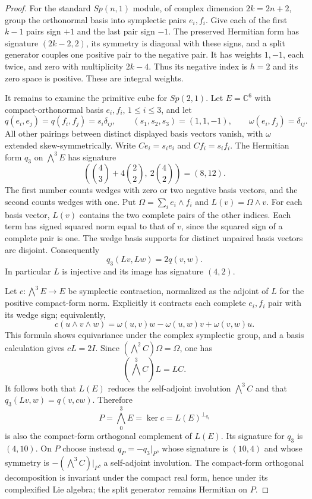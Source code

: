 \begin{proof}
For the standard $Sp(n,1)$ module, of complex dimension
$2k=2n+2$, group the orthonormal basis into symplectic pairs
$e_i,f_i$. Give each of the first $k-1$ pairs sign $+1$ and
the last pair sign $-1$. The preserved Hermitian form has
signature $(2k-2,2)$, its symmetry is diagonal with these
signs, and a split generator couples one positive pair to the
negative pair. It has weights $1,-1$, each twice, and zero
with multiplicity $2k-4$. Thus its negative index is $h=2$
and its zero space is positive. These are integral weights.

It remains to examine the primitive cube for $Sp(2,1)$.
Let $E=\mathbb C^6$ with compact-orthonormal basis
$e_i,f_i$, $1\leq i\leq3$, and let
\[
 q(e_i,e_j)=q(f_i,f_j)=s_i\delta_{ij},
 \qquad (s_1,s_2,s_3)=(1,1,-1),
 \qquad \omega(e_i,f_j)=\delta_{ij}.
\]
All other pairings between distinct displayed basis vectors
vanish, with $\omega$ extended skew-symmetrically. Write
$C e_i=s_i e_i$ and $C f_i=s_i f_i$. The Hermitian form
$q_3$ on $\bigwedge^3E$ has signature
\[
 \left(\binom43+4\binom22,\ 2\binom42\right)=(8,12).
\]
The first number counts wedges with zero or two negative
basis vectors, and the second counts wedges with one.
Put $\Omega=\sum_i e_i\wedge f_i$ and
$L(v)=\Omega\wedge v$. For each basis vector, $L(v)$
contains the two complete pairs of the other indices.
Each term has signed squared norm equal to that of $v$,
since the squared sign of a complete pair is one. The wedge
basis supports for distinct unpaired basis vectors are disjoint.
Consequently
\[
 q_3(Lv,Lw)=2q(v,w).
\]
In particular $L$ is injective and its image has signature
$(4,2)$.

Let $c:\bigwedge^3E\to E$ be symplectic contraction,
normalized as the adjoint of $L$ for the positive compact-form
norm. Explicitly it contracts each complete $e_i,f_i$ pair
with its wedge sign; equivalently,
\[
 c(u\wedge v\wedge w)
 =\omega(u,v)w-\omega(u,w)v+\omega(v,w)u.
\]
This formula shows equivariance under the complex symplectic
group, and a basis calculation gives $cL=2I$. Since
$(\bigwedge^2C)\Omega=\Omega$, one has
\[
 (\bigwedge^3C)L=LC.
\]
It follows both that $L(E)$ reduces the self-adjoint involution
$\bigwedge^3C$ and that
$q_3(Lv,w)=q(v,cw)$. Therefore
\[
 P=\bigwedge^3_0E=\ker c
   =L(E)^{\perp_{q_3}}
\]
is also the compact-form orthogonal complement of $L(E)$.
Its signature for $q_3$ is $(4,10)$. On $P$ choose instead
$q_P=-q_3|_P$, whose signature is $(10,4)$ and whose
symmetry is $-(\bigwedge^3C)|_P$, a self-adjoint involution.
The compact-form orthogonal decomposition is invariant under
the compact real form, hence under its complexified Lie algebra;
the split generator remains Hermitian on $P$.


\end{proof}
